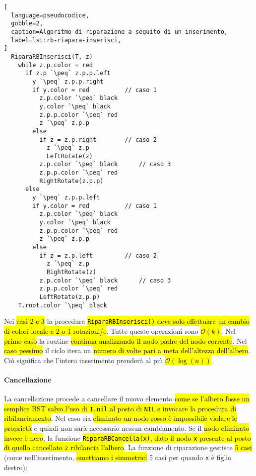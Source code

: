 \documentclass[a4paper,11pt,oneside]{article}
\theoremstyle{plain}
\theoremstyle{definition}
\theoremstyle{remark}
\newcommand{\peq}{$\gets$}
\begin{document}
\begin{lstlisting}[
  language=pseudocodice,
  gobble=2,
  caption=Algoritmo di riparazione a seguito di un inserimento,
  label=lst:rb-riapara-inserisci,
]
  RiparaRBInserisci(T, z)
    while z.p.color = red
      if z.p `\peq` z.p.p.left
        y `\peq` z.p.p.right
        if y.color = red          // caso 1
          z.p.color `\peq` black
          y.color `\peq` black
          z.p.p.color `\peq` red
          z `\peq` z.p.p
        else
          if z = z.p.right        // caso 2
            z `\peq` z.p
            LeftRotate(z)
          z.p.color `\peq` black      // caso 3
          z.p.p.color `\peq` red
          RightRotate(z.p.p)
      else
        y `\peq` z.p.p.left
        if y.color = red          // caso 1
          z.p.color `\peq` black
          y.color `\peq` black
          z.p.p.color `\peq` red
          z `\peq` z.p.p
        else
          if z = z.p.left         // caso 2
            z `\peq` z.p
            RightRotate(z)
          z.p.color `\peq` black      // caso 3
          z.p.p.color `\peq` red
          LeftRotate(z.p.p)
    T.root.color `\peq` black
\end{lstlisting}

Nei \hl{casi 2 e 3} la procedura \hl{\texttt{RiparaRBInserisci()} deve solo
effettuare un cambio di colori locale e 2 o 1 rotazioni/e}. Tutte queste
operazioni sono \hl{$\mathcal{O}(k)$}. Nel \hl{primo caso} la routine
\hl{continua analizzando il nodo padre del nodo corrente}. Nel \hl{caso pessimo}
il ciclo itera un \hl{numero di volte pari a meta dell'altezza dell'albero}. Ciò
significa che l'intero inserimento prenderà al più \hl{$\mathcal{O}(\log(n))$}.

\paragraph{Cancellazione} La cancellazione procede a cancellare il nuovo
elemento \hl{come se l'albero fosse un semplice BST salvo l'uso di
\texttt{T.nil} al posto di \texttt{NIL} e invocare la procedura di
ribilanciamento}. Nel caso sia \hl{eliminato un nodo rosso è impossibile violare
le proprietà} e quindi non sarà necessario nessun cambiamento. Se il \hl{nodo
eliminato invece è nero}, la funzione \hl{\texttt{RiparaRBCancella(x)}, dato il
nodo \texttt{x} presente al posto di quello cancellato \texttt{z} ribilancia
l'albero}. La funzione di riparazione gestisce \hl{5 casi} (come
nell'inserimento, \hl{omettiamo i simmetrici} 5 casi per quando \texttt{x} è
figlio destro):
\end{document}
